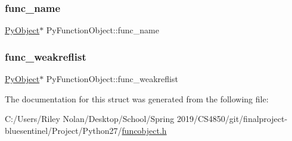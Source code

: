 \subsubsection{\texorpdfstring{func\_name}{func\_name}}
{\footnotesize\ttfamily \mbox{\hyperlink{_python27_2object_8h_aadc84ac7aed2cfa6f20c25f62bf3dac7}{Py\+Object}}$\ast$ Py\+Function\+Object\+::func\+\_\+name}

\mbox{\label{struct_py_function_object_abef9b746762125a815e52b8c6754f36e}} 
\subsubsection{\texorpdfstring{func\_weakreflist}{func\_weakreflist}}
{\footnotesize\ttfamily \mbox{\hyperlink{_python27_2object_8h_aadc84ac7aed2cfa6f20c25f62bf3dac7}{Py\+Object}}$\ast$ Py\+Function\+Object\+::func\+\_\+weakreflist}



The documentation for this struct was generated from the following file\+:\begin{DoxyCompactItemize}
\item 
C\+:/\+Users/\+Riley Nolan/\+Desktop/\+School/\+Spring 2019/\+C\+S4850/git/finalproject-\/bluesentinel/\+Project/\+Python27/\mbox{\hyperlink{funcobject_8h}{funcobject.\+h}}\end{DoxyCompactItemize}
